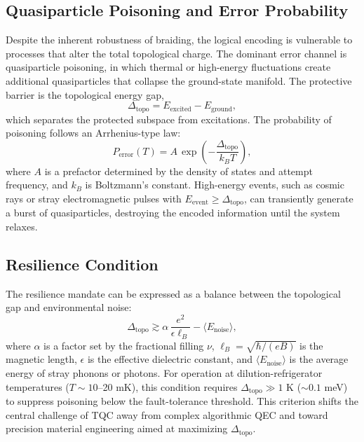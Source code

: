 \documentclass[aps,prl,twocolumn,superscriptaddress]{revtex4-2}
\begin{document}
\subsection{Quasiparticle Poisoning and Error Probability}
Despite the inherent robustness of braiding, the logical encoding is vulnerable to processes that alter the total topological charge. The dominant error channel is quasiparticle poisoning, in which thermal or high-energy fluctuations create additional quasiparticles that collapse the ground-state manifold. The protective barrier is the topological energy gap,
\begin{equation}
\Delta_{\text{topo}} = E_{\text{excited}} - E_{\text{ground}},
\end{equation}
which separates the protected subspace from excitations. The probability of poisoning follows an Arrhenius-type law:
\begin{equation}
P_{\text{error}}(T) = A \, \exp\!\left(-\frac{\Delta_{\text{topo}}}{k_B T}\right),
\end{equation}
where $A$ is a prefactor determined by the density of states and attempt frequency, and $k_B$ is Boltzmann’s constant. High-energy events, such as cosmic rays or stray electromagnetic pulses with $E_{\text{event}} \geq \Delta_{\text{topo}}$, can transiently generate a burst of quasiparticles, destroying the encoded information until the system relaxes.

\subsection{Resilience Condition}
The resilience mandate can be expressed as a balance between the topological gap and environmental noise:
\begin{equation}
\Delta_{\text{topo}} \gtrsim \alpha \, \frac{e^{2}}{\epsilon \ell_B} - \langle E_{\text{noise}} \rangle,
\end{equation}
where $\alpha$ is a factor set by the fractional filling $\nu$, $\ell_B = \sqrt{\hbar/(eB)}$ is the magnetic length, $\epsilon$ is the effective dielectric constant, and $\langle E_{\text{noise}} \rangle$ is the average energy of stray phonons or photons. For operation at dilution-refrigerator temperatures ($T \sim 10$--20 mK), this condition requires $\Delta_{\text{topo}} \gg 1$ K ($\sim 0.1$ meV) to suppress poisoning below the fault-tolerance threshold. This criterion shifts the central challenge of TQC away from complex algorithmic QEC and toward precision material engineering aimed at maximizing $\Delta_{\text{topo}}$.
\end{document}
